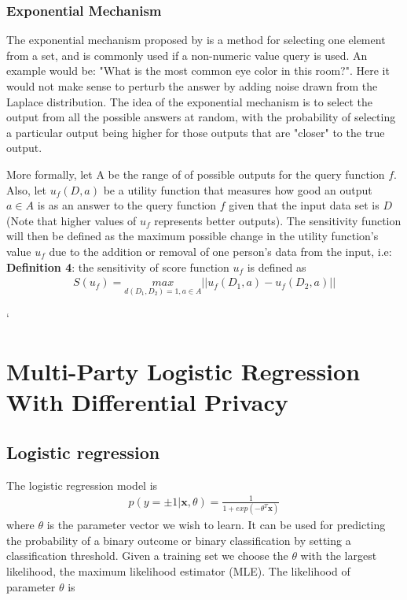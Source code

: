 
\subsubsection{Exponential Mechanism} \label{sec:Exponential Mechanism}
The exponential mechanism proposed by \cite{mcsherry2007} is a method for selecting one element from a set, and is commonly used if a non-numeric value query is used. An example would be: "What is the most common eye color in this room?". Here it would not make sense to perturb the answer by adding noise drawn from the Laplace distribution. The idea of the exponential mechanism is to select the output from all the possible answers at random, with the probability of selecting a particular output being higher for those outputs that are "closer" to the true output. 

More formally, let A be the range of of possible outputs for the query function $f$. Also, let $u_f(D,a)$ be a utility function that measures how good an output $a\in A$ is as an answer to the query function $f$ given that the input data set is $D$ (Note that higher values of $u_f$ represents better outputs). The sensitivity function will then be defined as the maximum possible change in the utility function's value $u_f$ due to the addition or removal of one person's data from the input, i.e: \newline
\textbf{Definition 4}: the sensitivity of score function $u_f$ is defined as
\begin{eqnarray} \label{ExpoMecDef}
S(u_f) = \underset{d(D_1,D_2)=1,a\in A}{max}||u_f(D_1, a)-u_f(D_2,a)||
 \end{eqnarray}
 
 `
\section{Multi-Party Logistic Regression With Differential Privacy}
\label{sec:logistic_regression}
 
 \subsection{Logistic regression}
 The logistic regression model is
  \begin{eqnarray} 
 p(y = ±1|\textbf{x}, \theta) = \frac{1}{1 + exp( - \theta^T \textbf{x})}
  \end{eqnarray}
  where $\theta$ is the parameter vector we wish to learn.
 It can be used for predicting the probability of a binary outcome or binary classification by setting a classification threshold. Given a training set we choose the $\theta$ with the largest likelihood, the maximum likelihood estimator (MLE)\citep{elkan2014logreg}. The likelihood of parameter $\theta$ is
 

